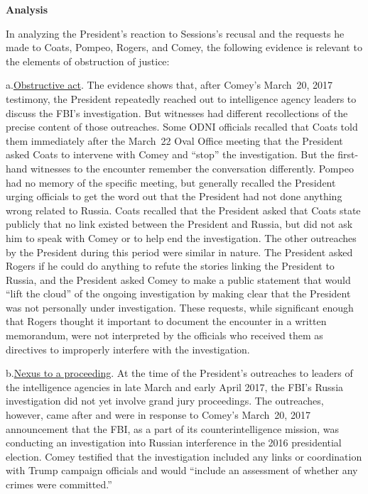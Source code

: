 \begin{center}
\textbf{Analysis}
\end{center}

In analyzing the President's reaction to Sessions's recusal and the requests he made to Coats, Pompeo, Rogers, and Comey, the following evidence is relevant to the elements of obstruction of justice:

a.\qquad\underline{Obstructive act}.
The evidence shows that, after Comey's March~20, 2017 testimony, the President repeatedly reached out to intelligence agency leaders to discuss the FBI's investigation.
But witnesses had different recollections of the precise content of those outreaches.
Some ODNI officials recalled that Coats told them immediately after the March~22 Oval Office meeting that the President asked Coats to intervene with Comey and ``stop'' the investigation.
But the first-hand witnesses to the encounter remember the conversation differently.
Pompeo had no memory of the specific meeting, but generally recalled the President urging officials to get the word out that the President had not done anything wrong related to Russia.
Coats recalled that the President asked that Coats state publicly that no link existed between the President and Russia, but did not ask him to speak with Comey or to help end the investigation.
The other outreaches by the President during this period were similar in nature.
The President asked Rogers if he could do anything to refute the stories linking the President to Russia, and the President asked Comey to make a public statement that would ``lift the cloud'' of the ongoing investigation by making clear that the President was not personally under investigation.
These requests, while significant enough that Rogers thought it important to document the encounter in a written memorandum, were not
interpreted by the officials who received them as directives to improperly interfere with the investigation.

b.\qquad\underline{Nexus to a proceeding}.
At the time of the President's outreaches to leaders of the intelligence agencies in late March and early April 2017, the FBI's Russia investigation did not yet involve grand jury proceedings.
The outreaches, however, came after and were in response to Comey's March~20, 2017 announcement that the FBI, as a part of its counterintelligence mission, was conducting an investigation into Russian interference in the 2016 presidential election.
Comey testified that the investigation included any links or coordination with Trump campaign officials and would ``include an assessment of whether any crimes were committed.''

